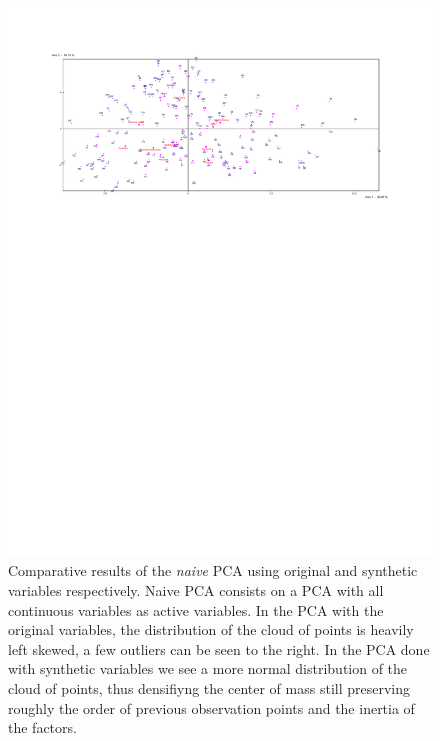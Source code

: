 \documentclass[a4paper,10pt,twocolumn]{article}
\begin{document}
\begin{figure}[!ht]
\begin{center}
\includegraphics[width=17cm]{f2b.pdf}
\caption{\footnotesize{Comparative results of the \emph{naive} PCA using original and synthetic variables respectively. Naive PCA consists on a PCA with all continuous variables as active variables. In the PCA with the original variables, the distribution of the cloud of points is heavily left skewed, a few outliers can be seen to the right. In the PCA done with synthetic variables we see a more normal distribution of the cloud of points, thus densifiyng the center of mass still preserving roughly the order of previous observation points and the inertia of the factors.}\label{fig2}}
\end{center}
\end{figure}
\end{document}

